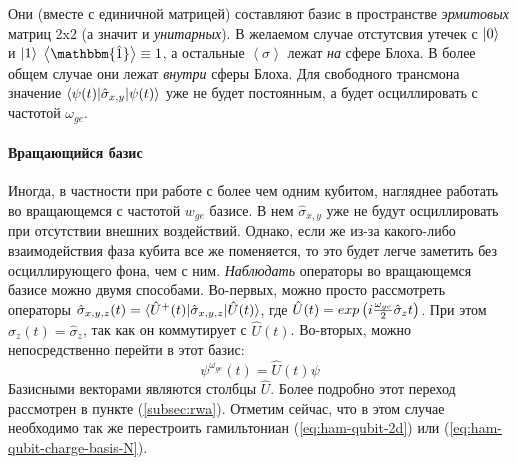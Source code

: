 \documentclass[12pt, twoside]{report}
\DeclarePairedDelimiter\bra{\langle}{\rvert}
\DeclarePairedDelimiter\ket{\lvert}{\rangle}
\numberwithin{equation}{section}
\numberwithin{figure}{section}
\begin{document}
Они (вместе с единичной матрицей) составляют базис в пространстве \textit{эрмитовых} матриц 2x2 (а значит и \textit{унитарных}). В желаемом случае отстутсвия утечек с $\ket{0}$ и $\ket{1}$ $\left<\mathbbm{\hat 1}\right> \equiv 1$, а остальные $\left<\sigma\right>$ лежат \textit{на} сфере Блоха. В более общем случае они лежат \textit{внутри} сферы Блоха. Для свободного трансмона значение $\bra{\psi(t)}\hat{\sigma}_{x,y}\ket{\psi(t)}$ уже не будет постоянным, а будет осциллировать с частотой $\omega_{ge}$. 
\paragraph{Вращающийся базис} Иногда, в частности при работе с более чем одним кубитом, нагляднее работать во вращающемся с частотой $w_{ge}$ базисе. В нем $\hat{\sigma}_{x,y}$ уже не будут осциллировать при отсутствии внешних воздействий. Однако, если же из-за какого-либо взаимодействия  фаза кубита все же поменяется, то это будет легче заметить без осциллирующего фона, чем с ним. 
\newline
\textit{Наблюдать} операторы во вращающемся базисе можно двумя способами.
\newline
Во-первых, можно просто рассмотреть операторы $ \hat{\sigma}_{x,y,z}(t) = \bra{\hat{U}^+(t)}\hat{\sigma}_{x,y,z}\ket{\hat{U}(t)}$, где $\hat{U}(t) \nolinebreak=\nolinebreak exp\left( i \frac{\omega_{ge}}{2} \hat{\sigma}_z t \right)$. При этом $\hat{\sigma}_z(t) = \hat{\sigma}_z$, так как он коммутирует с $\hat{U}(t)$.
\newline
\linebreak
Во-вторых, можно непосредственно перейти в этот базис:
\begin{equation}
\psi^{\omega_{ge}}(t) = \hat{U}(t) \psi
\label{eq:rotating-frame}
\end{equation}
Базисными векторами являются столбцы $\hat{U}$. Более подробно этот переход рассмотрен в пункте (\ref{subsec:rwa}). Отметим сейчас, что в этом случае необходимо так же перестроить гамильтониан (\ref{eq:ham-qubit-2d}) или (\ref{eq:ham-qubit-charge-basis-N}).
\end{document}
